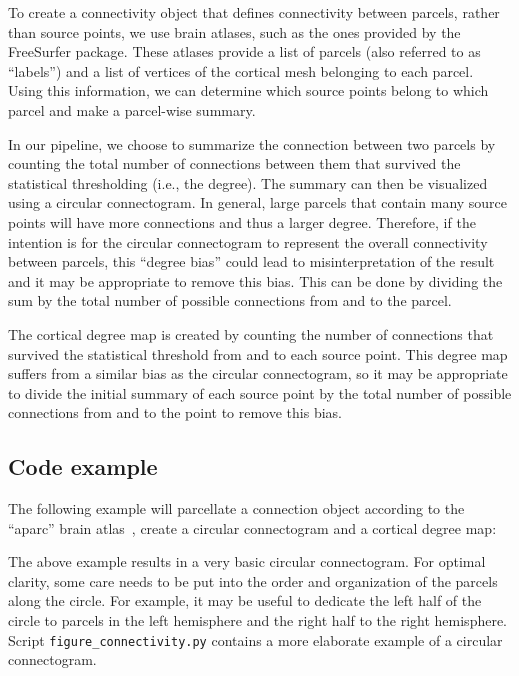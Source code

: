 \documentclass[utf8]{frontiersSCNS}
\renewcommand{\cite}[1]{~\citep{#1}}
\newcommand{\code}[1]{\lstinline{#1}}
\begin{document}
To create a connectivity object that defines connectivity between parcels, rather than source points, we use brain atlases, such as the ones provided by the FreeSurfer package.
These atlases provide a list of parcels (also referred to as ``labels'') and a list of vertices of the cortical mesh belonging to each parcel.
Using this information, we can determine which source points belong to which parcel and make a parcel-wise summary.

In our pipeline, we choose to summarize the connection between two parcels by counting the total number of connections between them that survived the statistical thresholding (i.e., the degree).
The summary can then be visualized using a circular connectogram.
In general, large parcels that contain many source points will have more connections and thus a larger degree.
Therefore, if the intention is for the circular connectogram to represent the overall connectivity between parcels, this ``degree bias'' could lead to misinterpretation of the result and it may be appropriate to remove this bias.
This can be done by dividing the sum by the total number of possible connections from and to the parcel.

The cortical degree map is created by counting the number of connections that survived the statistical threshold from and to each source point.
This degree map suffers from a similar bias as the circular connectogram, so it may be appropriate to divide the initial summary of each source point by the total number of possible connections from and to the point to remove this bias.

\subsection{Code example}

The following example will parcellate a connection object according to the ``aparc'' brain atlas\cite{Fischl2004}, create a circular connectogram and a cortical degree map:


The above example results in a very basic circular connectogram.
For optimal clarity, some care needs to be put into the order and organization of the parcels along the circle.
For example, it may be useful to dedicate the left half of the circle to parcels in the left hemisphere and the right half to the right hemisphere.
Script \code{figure_connectivity.py} contains a more elaborate example of a circular connectogram.
\end{document}
